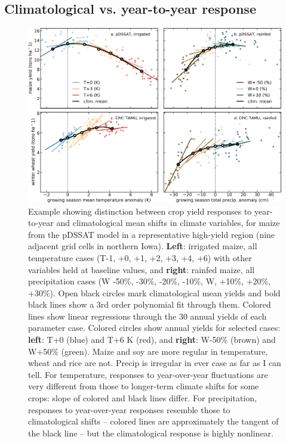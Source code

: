 \documentclass[gmd, manuscript]{copernicus} %
\begin{document}
\subsection{Climatological vs. year-to-year response}
\begin{figure}[ht]
\centering
   \includegraphics[width=15cm]{figures/phase_II_em_figure_1.png}
   \caption{
    Example showing distinction between crop yield responses to year-to-year and climatological mean shifts in climate variables, for  
    maize from the pDSSAT model in a representative high-yield region (nine adjacent grid cells in northern Iowa).
    \textbf{Left}: irrigated maize, all temperature cases (T-1, +0, +1, +2, +3, +4, +6) with other variables held at baseline values, and \textbf{right}: rainfed maize, all precipitation cases (W -50\%, -30\%, -20\%, -10\%, W, +10\%, +20\%, +30\%).
    Open black circles mark climatological mean yields and bold black lines show a 3rd order polynomial fit through them. Colored lines show linear regressions through the 30 annual yields of each parameter case. Colored circles show annual yields for selected cases:
    \textbf{left}: T+0 (blue) and T+6 K (red), and \textbf{right}: W-50\% (brown) and W+50\% (green).
    Maize and soy are more regular in temperature, wheat and rice are not. Precip is irregular in ever case as far as I can tell.
    For temperature, responses to year-over-year fluctuations are very different from those to longer-term climate shifts for some crops: slope of colored and black lines differ. 
    For precipitation, responses to year-over-year responses resemble those to climatological shifts -- colored lines are approximately the tangent of the black line -- but the climatological response is highly nonlinear. 
   }
   \label{fig:yearvclim}
\end{figure}
\end{document}
